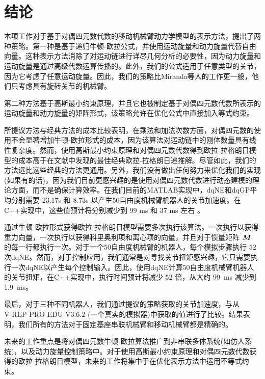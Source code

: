
\section{\normalfont\bfseries 结论\label{sec:Conclusions}}

本项工作对于基于对偶四元数代数的移动机械臂动力学模型的表示方法，提出了两种策略。第一种是基于递归牛顿-欧拉公式，并使用运动旋量和动力旋量代替自由向量。这种表示方法消除了对运动链进行详尽几何分析的必要性，因为动力旋量和运动旋量是通过高级代数运算传播的。此外，我们的公式适用于任意类型的关节，因为它考虑了任意运动旋量。因此，我们的策略比Miranda等人\cite{MirandadeFarias2019Journal}的工作更一般，他们只考虑具有旋转关节的机械臂。

第二种方法基于高斯最小约束原理，并且它也被制定基于对偶四元数代数所表示的运动旋量和动力旋量的矩阵形式，该策略允许在优化公式中直接加入等式约束。

所提议方法与经典方法的成本比较表明，在乘法和加法次数方面，对偶四元数的使用不会显著增加牛顿-欧拉形式的成本，因为该算法对运动链中的刚体数量具有线性复杂度。然而，使用高斯最小约束原理和对偶四元数代数得到欧拉-拉格朗日模型的成本高于在文献中发现的最佳经典欧拉-拉格朗日递推解。尽管如此，我们的方法远比这些经典的方法更通用。另外，我们没有做出任何努力来优化我们的实现(如果有的话)，因为我们目前更感兴趣的是使用对偶四元数代数进行动态建模的理论方面，而不是确保计算效率。在我们目前的MATLAB实现中，dqNE和dqGP平均分别需要 23.17s 和 8.73s 以产生$50$自由度机械臂机器人的关节加速度。在C++实现中，这些值预计将分别减少到 99 ms 和 37 ms 左右 \cite{AdornoDQRobotics2020}。

通过牛顿-欧拉形式获得欧拉-拉格朗日模型需要多次执行该算法。一次执行以获得重力向量，一次执行以获得科里奥利项和离心项的向量，并且对于惯量矩阵 $\boldsymbol{M}$ 的每一行都执行一次。对于一个$50$自由度机械臂的机器人，每个模拟步骤执行 $52$ 次dqNE。然而，对于控制应用，我们通常是对寻找关节扭矩感兴趣，它只需要执行一次dqNE以产生每个控制输入。因此，使用dqNE计算$50$自由度机械臂机器人的关节扭矩，在C++实现中，执行时间预计将减少 $52$ 倍，从大约 99~ms 减少到 1.9~ms。

最后，对于三种不同机器人，我们通过提议的策略获取的关节加速度，与从 ${\text{V-REP PRO EDU V3.6.2}}$ (一个真实的模拟器)中获取的值进行了比较。结果表明，我们所有的方法对于固定基座串联机械臂和移动机械臂都是精确的。

未来的工作重点是将对偶四元数牛顿-欧拉算法推广到非串联多体系统(如仿人系统)，以及动力旋量控制策略中。对于使用高斯最小约束原理和对偶四元数代数获得的欧拉-拉格朗日模型，未来的工作将集中于在优化表示方法中运用不等式约束。
